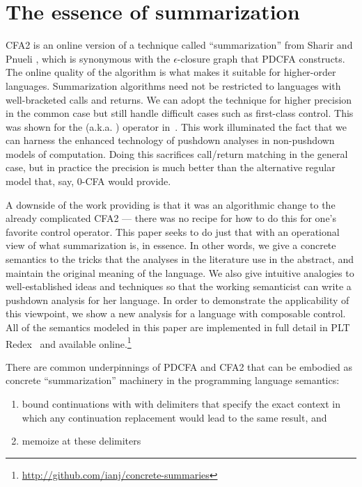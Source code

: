 \section{The essence of summarization}

CFA2 is an online version of a technique called ``summarization'' from Sharir and Pnueli \citep[Chapter 7]{local:muchnick:jones:flow-analysis:1981}, which is synonymous with the $\epsilon$-closure graph that PDCFA constructs.
%
The online quality of the algorithm is what makes it suitable for higher-order languages.
%
Summarization algorithms need not be restricted to languages with well-bracketed calls and returns.
%
We can adopt the technique for higher precision in the common case but still handle difficult cases such as first-class control.
%
This was shown for the  (a.k.a. ) operator in~\citet{ianjohnson:Vardoulakis2011Pushdown}.
%
This work illuminated the fact that we can harness the enhanced technology of pushdown analyses in non-pushdown models of computation.
%
Doing this sacrifices call/return matching in the general case, but in practice the precision is much better than the alternative regular model that, say, 0-CFA would provide.

A downside of the work providing  is that it was an algorithmic change to the already complicated CFA2 --- there was no recipe for how to do this for one's favorite control operator.
%
This paper seeks to do just that with an operational view of what summarization is, in essence.
%
In other words, we give a concrete semantics to the tricks that the analyses in the literature use in the abstract, and maintain the original meaning of the language.
%
We also give intuitive analogies to well-established ideas and techniques so that the working semanticist can write a pushdown analysis for her language.
%
In order to demonstrate the applicability of this viewpoint, we show a new analysis for a language with composable control.
%
All of the semantics modeled in this paper are implemented in full detail in PLT Redex~\citep{ianjohnson:Felleisen:2009:SEP:1795772} and available online.\footnote{\url{http://github.com/ianj/concrete-summaries}}

There are common underpinnings of PDCFA and CFA2 that can be embodied as concrete ``summarization'' machinery in the programming language semantics: 
\begin{enumerate}
\item{bound continuations with with delimiters that specify the exact context in which any continuation replacement would lead to the same result, and}
\item{memoize at these delimiters}
\end{enumerate}

